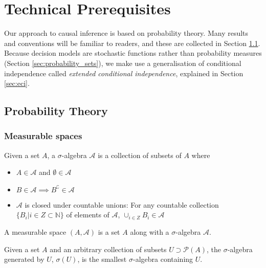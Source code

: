 

\section{Technical Prerequisites}\label{sec:tech_prereq}

Our approach to causal inference is based on probability theory. Many results and conventions will be familiar to readers, and these are collected in Section \ref{sec:standard_prob}. Because decision models are stochastic functions rather than probability measures (Section \ref{sec:probability_sets}), we make use a generalisation of conditional independence called \emph{extended conditional independence}, explained in Section \ref{sec:eci}.

\subsection{Probability Theory}\label{sec:standard_prob}

\subsubsection{Measurable spaces}

\begin{definition}
Given a set $A$, a $\sigma$-algebra $\mathcal{A}$ is a collection of subsets of $A$ where
\begin{itemize}
	\item $A\in \mathcal{A}$ and $\emptyset\in \mathcal{A}$
	\item $B\in \mathcal{A}\implies B^{\complement}\in\mathcal{A}$
	\item $\mathcal{A}$ is closed under countable unions: For any countable collection $\{B_i|i\in Z\subset \mathbb{N}\}$ of elements of $\mathcal{A}$, $\cup_{i\in Z}B_i\in \mathcal{A}$ 
\end{itemize}
\end{definition}

\begin{definition}
A measurable space $(A,\mathcal{A})$ is a set $A$ along with a $\sigma$-algebra $\mathcal{A}$.
\end{definition}

\begin{definition}
Given a set $A$ and an arbitrary collection of subsets $U\supset\mathscr{P}(A)$, the $\sigma$-algebra generated by $U$, $\sigma(U)$, is the smallest $\sigma$-algebra containing $U$.
\end{definition}

